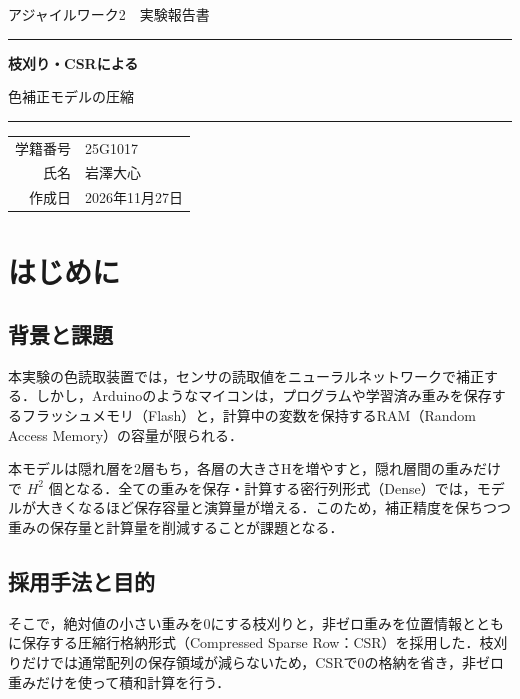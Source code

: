 \documentclass[
  10pt,
  a4paper,
]{article}
\author{}
\date{}
\renewcommand{\arraystretch}{1.15}
\begin{document}
\hypersetup{pageanchor=false}
\begin{titlepage}
\centering
\vspace*{22mm}
{\Large アジャイルワーク2　実験報告書\par}
\vspace{24mm}
\rule{0.88\linewidth}{0.7pt}\par
\vspace{9mm}
{\Huge\bfseries 枝刈り・CSRによる\par 色補正モデルの圧縮\par}
\vspace{9mm}
\rule{0.88\linewidth}{0.7pt}\par
\vfill
\renewcommand{\arraystretch}{1.6}
{\large
\begin{tabular}{rl}
学籍番号 & 25G1017 \\
氏名 & 岩澤大心 \\
作成日 & 2026年11月27日\end{tabular}
}
\vspace*{25mm}
\end{titlepage}
\hypersetup{pageanchor=true}
\setcounter{page}{1}

\section{はじめに}\label{ux306fux3058ux3081ux306b}

\subsection{背景と課題}\label{ux80ccux666fux3068ux8ab2ux984c}

本実験の色読取装置では，センサの読取値をニューラルネットワークで補正する．しかし，Arduinoのようなマイコンは，プログラムや学習済み重みを保存するフラッシュメモリ（Flash）と，計算中の変数を保持するRAM（Random
Access Memory）の容量が限られる．

本モデルは隠れ層を2層もち，各層の大きさHを増やすと，隠れ層間の重みだけで
\(H^2\)
個となる．全ての重みを保存・計算する密行列形式（Dense）では，モデルが大きくなるほど保存容量と演算量が増える．このため，補正精度を保ちつつ重みの保存量と計算量を削減することが課題となる．

\subsection{採用手法と目的}\label{ux63a1ux7528ux624bux6cd5ux3068ux76eeux7684}

そこで，絶対値の小さい重みを0にする枝刈りと，非ゼロ重みを位置情報とともに保存する圧縮行格納形式（Compressed
Sparse
Row：CSR）を採用した．枝刈りだけでは通常配列の保存領域が減らないため，CSRで0の格納を省き，非ゼロ重みだけを使って積和計算を行う．
\end{document}
